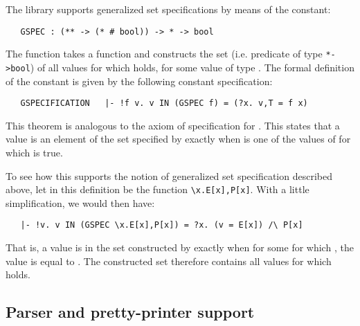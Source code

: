 The  library supports generalized set specifications by means of
the constant:

\begin{hol}
\begin{verbatim}
   GSPEC : (** -> (* # bool)) -> * -> bool
\end{verbatim}\end{hol}

\noindent The function  takes a function 
and constructs the set (i.e. predicate of type {\small\verb!*->bool!}) of all
values  for which  holds, for some value  of
type \ml{**}. The formal definition of the constant  is given by the
following constant specification:

\begin{hol}
\begin{verbatim}
   GSPECIFICATION   |- !f v. v IN (GSPEC f) = (?x. v,T = f x)
\end{verbatim}\end{hol}

\noindent This theorem is analogous to the axiom of specification for .
This states that a value  is an element of the set specified by
 exactly when  is one of the values of  for which
 is true.  

To see how this supports the notion of generalized set specification described
above, let  in this definition be the function
{\small\verb!\x.E[x],P[x]!}.  With a little simplification, we would then have:

\begin{hol}
\begin{verbatim}
   |- !v. v IN (GSPEC \x.E[x],P[x]) = ?x. (v = E[x]) /\ P[x]
\end{verbatim}\end{hol}

\noindent That is, a value  is in the set constructed by 
exactly when for some  for which , the value  is equal to
.  The constructed set therefore contains all values  for
which  holds.

\subsection{Parser and pretty-printer support}\label{abst}

